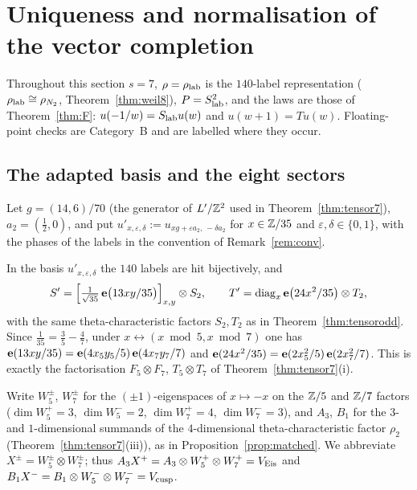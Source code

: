 \section{Uniqueness and normalisation of the vector completion}\label{sec:uniq}
Throughout this section $s=7$, $\rho=\rho_{\rm lab}$ is the $140$-label representation ($\rho_{\rm lab}\cong\rho_{N_2}$, Theorem~\ref{thm:weil8}), $P=S_{\rm lab}^2$,
and the laws are those of Theorem~\ref{thm:F}: $u(-1/w)=S_{\rm lab}u(w)$ and $u(w+1)=Tu(w)$. Floating-point checks are Category~B and are labelled where they occur.

\subsection{The adapted basis and the eight sectors}\label{sec:basis}
Let $g=(14,6)/70$ (the generator of $L'/\mathbb{Z}^2$ used in Theorem~\ref{thm:tensor7}), $a_2=(\tfrac12,0)$, and put
$u'_{x,\varepsilon,\delta}:=u_{xg+\varepsilon a_2,\,-\delta a_2}$ for $x\in\mathbb{Z}/35$ and $\varepsilon,\delta\in\{0,1\}$, with the phases of the labels in the convention of Remark~\ref{rem:conv}.

\begin{proposition}[Adapted-basis splitting at $s=7$]\label{prop:basis9}
In the basis $u'_{x,\varepsilon,\delta}$ the $140$ labels are hit bijectively, and
\[
S'=\Bigl[\tfrac{1}{\sqrt{35}}\,\mathbf{e}\bigl(13xy/35\bigr)\Bigr]_{x,y}\otimes S_2,\qquad T'=\mathrm{diag}_x\,\mathbf{e}\bigl(24x^2/35\bigr)\otimes T_2,
\]
with the same theta-characteristic factors $S_2,T_2$ as in Theorem~\ref{thm:tensorodd}. Since $\tfrac1{35}=\tfrac35-\tfrac47$, under $x\leftrightarrow(x\bmod5,x\bmod7)$ one has
$\mathbf{e}(13xy/35)=\mathbf{e}(4x_5y_5/5)\,\mathbf{e}(4x_7y_7/7)$ and $\mathbf{e}(24x^2/35)=\mathbf{e}(2x_5^2/5)\,\mathbf{e}(2x_7^2/7)$. This is exactly the factorisation $F_5\otimes F_7$, $T_5\otimes T_7$ of Theorem~\ref{thm:tensor7}(i).
\end{proposition}

Write $W_5^\pm$, $W_7^\pm$ for the $(\pm1)$-eigenspaces of $x\mapsto-x$ on the $\mathbb{Z}/5$ and $\mathbb{Z}/7$ factors ($\dim W_5^+=3$, $\dim W_5^-=2$, $\dim W_7^+=4$, $\dim W_7^-=3$), and $A_3$, $B_1$ for the $3$- and $1$-dimensional summands of the $4$-dimensional theta-characteristic factor $\rho_2$ (Theorem~\ref{thm:tensor7}(iii)), as in Proposition~\ref{prop:matched}. We abbreviate $X^\pm=W_5^\pm\otimes W_7^\pm$; thus $A_3X^+=A_3\otimes W_5^+\otimes W_7^+=V_{\rm Eis}$ and $B_1X^-=B_1\otimes W_5^-\otimes W_7^-=V_{\rm cusp}$.

